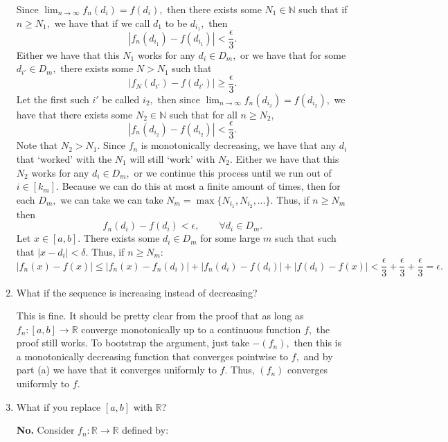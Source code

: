 \documentclass[11pt]{article}
\newcommand{\bbN}{\mathbb{N}}
\newcommand{\bbR}{\mathbb{R}}
\begin{document}
\begin{enumerate}
\begin{solution}
        Since $\lim_{n\to \infty}f_n(d_i) = f(d_i),$ then there exists some $N_1 \in \bbN$ such that if $n\geq N_1,$ we have that if we call $d_1$ to be $d_{i_1},$ then
        \[|f_n(d_{i_1}) - f(d_{i_1})|< \frac{\epsilon}{3}.\] Either we have that this $N_1$ works for any $d_i \in D_m,$ or we have that for some $d_{i'} \in D_m,$ there exists some $N >N_1$ such that 
        \[|f_N(d_{i'}) - f(d_{i'})|\geq \frac{\epsilon}{3}.\] Let the first such $i'$ be called $i_2,$ then since $\lim_{n\to \infty}f_n(d_{i_2}) = f(d_{i_2}),$ we have that there exists some $N_2 \in \bbN$ such that for all $n\geq N_2,$
        \[|f_n(d_{i_2}) - f(d_{i_2})| < \frac{\epsilon}{3}.\] Note that $N_2 >N_1.$ Since $f_n$ is monotonically decreasing, we have that any $d_i$ that `worked' with the $N_1$ will still `work' with $N_2.$ Either we have that this $N_2$ works for any $d_{i}\in D_m,$ or we continue this process until we run out of $i \in [k_m].$ Because we can do this at most a finite amount of times, then for each $D_m,$ we can take we can take $N_m = \max\{N_{i_1}, N_{i_2}, \dots\}.$ Thus, if $n\geq N_m$ then 
        \[f_n(d_i) - f(d_i) < \epsilon, \qquad \forall d_i \in D_m.\]
        Let $x\in [a,b].$ There exists some $d_i \in D_m$ for some large $m$ such that such that $|x-d_i|< \delta.$ Thus, if $n\geq N_m:$
        \[|f_n(x) - f(x)|\leq |f_n(x) - f_n(d_i)| + |f_n(d_i) - f(d_i)| + |f(d_i) - f(x)| < \frac{\epsilon}{3} + \frac{\epsilon}{3} + \frac{\epsilon}{3} = \epsilon.\]
    \end{solution}
    \item 
    \begin{problem}
        What if the sequence is increasing instead of decreasing?
    \end{problem}
    \begin{solution}
        This is fine. It should be pretty clear from the proof that as long as $f_n: [a,b] \to \bbR$ converge monotonically up to a continuous function $f,$ the proof still works. To bootstrap the argument, just take $-(f_n),$ then this is a monotonically decreasing function that converges pointwise to $f,$ and by part (a) we have that it converges uniformly to $f.$ Thus, $(f_n)$ converges uniformly to $f.$
    \end{solution}
    \item 
    \begin{problem}
        What if you replace $[a,b]$ with $\bbR$?
    \end{problem}
    \begin{solution}
        \textbf{No.} Consider $f_n:\bbR \to \bbR$ defined by:

\end{solution}
\end{enumerate}
\end{document}
